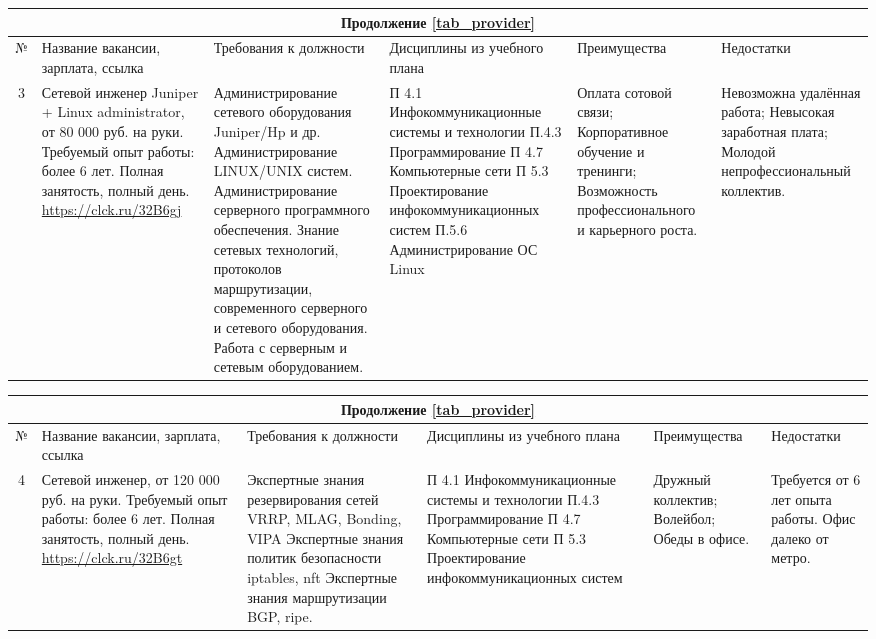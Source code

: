 \documentclass[14pt]{extreport}
\begin{document}
\begin{landscape}
\begin{table}[H]
	\begin{tabular}{|c|p{3.3cm}|p{6cm}|p{4.7cm}|p{5.5cm}|p{3.5cm}|}
	\multicolumn{6}{c}{Продолжение \ref{tab_provider}} \\
	\hline № & {Название вакансии, зарплата, ссылка} & {Требования к должности} & {Дисциплины из учебного плана} & {Преимущества} & {Недостатки} \\
 	\hline 3 & {Сетевой инженер Juniper + Linux administrator,
от 80 000 руб. на руки.
Требуемый опыт работы: более 6 лет.
Полная занятость, полный день. \url{https://clck.ru/32B6gj}} & {Администрирование сетевого оборудования Juniper/Hp и др.
Администрирование LINUX/UNIX систем.
Администрирование серверного программного обеспечения.
Знание сетевых технологий, протоколов маршрутизации, современного серверного и сетевого оборудования.
Работа с серверным и сетевым оборудованием.} & {П 4.1 Инфокоммуникационные системы и технологии
П.4.3 Программирование
П 4.7 Компьютерные сети
П 5.3 Проектирование инфокоммуникационных систем
П.5.6 Администрирование ОС Linux} & {Оплата сотовой связи;
Корпоративное обучение и тренинги;
Возможность профессионального и карьерного роста.} & {Невозможна удалённая работа;
Невысокая заработная плата;
Молодой непрофессиональный коллектив.} \\
	\hline
	\end{tabular}
\end{table}

\begin{table}[H]
	\begin{tabular}{|c|p{3.3cm}|p{6cm}|p{4.7cm}|p{5.5cm}|p{3.5cm}|}
	\multicolumn{6}{c}{Продолжение \ref{tab_provider}} \\
	\hline № & {Название вакансии, зарплата, ссылка} & {Требования к должности} & {Дисциплины из учебного плана} & {Преимущества} & {Недостатки} \\
 	\hline 4 & {Сетевой инженер,
от 120 000 руб. на руки.
Требуемый опыт работы: более 6 лет.
Полная занятость, полный день. \url{https://clck.ru/32B6gt}} & {Экспертные знания резервирования сетей VRRP, MLAG, Bonding, VIPA
Экспертные знания политик безопасности iptables, nft
Экспертные знания маршрутизации BGP, ripe.} & {П 4.1 Инфокоммуникационные системы и технологии
П.4.3 Программирование
П 4.7 Компьютерные сети
П 5.3 Проектирование инфокоммуникационных систем} & {Дружный коллектив;
Волейбол;
Обеды в офисе.} & {Требуется от 6 лет опыта работы. Офис далеко от метро.} \\
	\hline
	\end{tabular}
\end{table}


\end{landscape}
\end{document}
